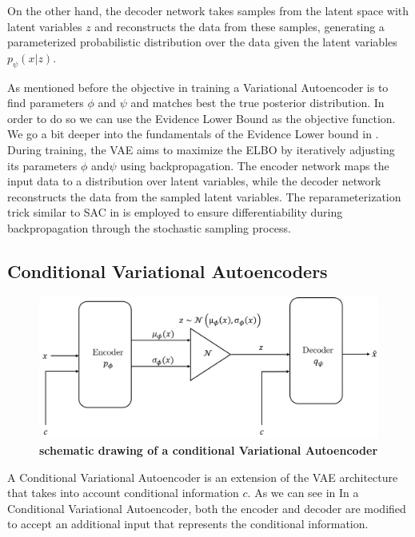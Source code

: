 On the other hand, the decoder network takes samples from the latent space with latent variables $z$ and reconstructs the data from these samples, generating a parameterized probabilistic distribution over the data given the latent variables $p_\psi(x|z)$. 

As mentioned before the objective in training a Variational Autoencoder is to find parameters $\phi$ and $\psi$ and matches best the true posterior distribution. In order to do so we can use the Evidence Lower Bound as the objective function. We go a bit deeper into the fundamentals of the Evidence Lower bound in . \\
During training, the VAE aims to maximize the ELBO by iteratively adjusting its parameters $\phi$ and$\psi$ using backpropagation. The encoder network maps the input data to a distribution over latent variables, while the decoder network reconstructs the data from the sampled latent variables. The reparameterization trick similar to SAC in  is employed to ensure differentiability during backpropagation through the stochastic sampling process. 



\subsection{Conditional Variational Autoencoders}

\begin{figure}
    \begin{center}
        \includegraphics[width=0.7\linewidth]{figures/background/CVAE.png}
        \caption[Conditional Variational Autoencoder schematics]{\textbf{schematic drawing of a conditional Variational Autoencoder}}
        \label{fig:conditional-Variational_Autoencoder_schematics}
    \end{center}
\end{figure}
A Conditional Variational Autoencoder is an extension of the VAE architecture that takes into account conditional information $c$. As we can see in In a Conditional Variational Autoencoder, both the encoder and decoder are modified to accept an additional input that represents the conditional information. 

